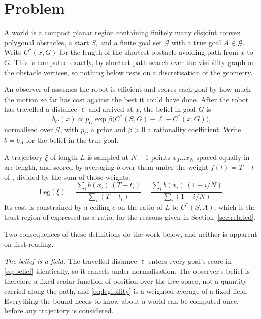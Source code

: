 \documentclass[journal]{IEEEtran}
\newcommand{\costto}[2]{C^{*}(#1, #2)}
\begin{document}
\section{Problem}
\label{sec:problem}

A world is a compact planar region containing finitely many disjoint convex
polygonal obstacles, a start $S$, and a finite goal set $\mathcal{G}$ with a
true goal $A \in \mathcal{G}$. Write $\costto{x}{G}$ for the length of the
shortest obstacle-avoiding path from $x$ to $G$. This is computed exactly, by
shortest path search over the visibility graph on the obstacle vertices, so
nothing below rests on a discretisation of the geometry.

An observer of \cite{dragan2013legibility} assumes the robot is efficient and
scores each goal by how much the motion so far has cost against the best it
could have done. After the robot has travelled a distance $\ell$ and arrived at
$x$, the belief in goal $G$ is
\begin{equation}
b_G(x) \propto p_G \exp \beta \big( \costto{S}{G} - \ell - \costto{x}{G} \big),
\label{eq:belief}
\end{equation}
normalised over $\mathcal{G}$, with $p_G$ a prior and $\beta > 0$ a rationality
coefficient. Write $b = b_A$ for the belief in the true goal.

A trajectory $\xi$ of length $L$ is sampled at $N + 1$ points $x_0 \dots x_N$
spaced equally in arc length, and scored by averaging $b$ over them under the
weight $f(t) = T - t$ of \cite{dragan2013legibility}, divided by the sum of
those weights:
\begin{equation}
\mathrm{Leg}(\xi)
  = \frac{\sum_i b(x_i)\,(T - t_i)}{\sum_i (T - t_i)}
  = \frac{\sum_i b(x_i)\,(1 - i/N)}{\sum_i (1 - i/N)} .
\label{eq:legibility}
\end{equation}
Its cost is constrained by a ceiling $c$ on the ratio of $L$ to
$\costto{S}{A}$, which is the trust region of \cite{dragan2013generating}
expressed as a ratio, for the reasons given in Section~\ref{sec:related}.

Two consequences of these definitions do the work below, and neither is
apparent on first reading.

\emph{The belief is a field.} The travelled distance $\ell$ enters every goal's
score in \eqref{eq:belief} identically, so it cancels under normalisation. The
observer's belief is therefore a fixed scalar function of position over the
free space, not a quantity carried along the path, and \eqref{eq:legibility} is
a weighted average of a fixed field. Everything the bound needs to know about
a world can be computed once, before any trajectory is considered.
\end{document}
